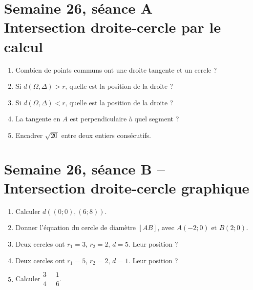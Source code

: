 \section{Semaine 26, séance A -- Intersection droite-cercle par le calcul}
\begin{enumerate}
  \item Combien de points communs ont une droite tangente et un cercle ?
  \item Si $d(\Omega,\Delta)>r$, quelle est la position de la droite ?
  \item Si $d(\Omega,\Delta)<r$, quelle est la position de la droite ?
  \item La tangente en $A$ est perpendiculaire à quel segment ?
  \item Encadrer $\sqrt{20}$ entre deux entiers consécutifs.
\end{enumerate}

\section{Semaine 26, séance B -- Intersection droite-cercle graphique}
\begin{enumerate}
  \item Calculer $d((0;0),(6;8))$.
  \item Donner l'équation du cercle de diamètre $[AB]$, avec $A(-2;0)$ et $B(2;0)$.
  \item Deux cercles ont $r_1=3$, $r_2=2$, $d=5$. Leur position ?
  \item Deux cercles ont $r_1=5$, $r_2=2$, $d=1$. Leur position ?
  \item Calculer $\dfrac34-\dfrac16$.
\end{enumerate}

